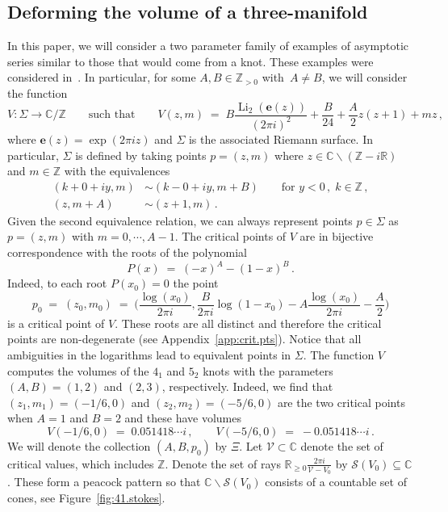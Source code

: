 \documentclass[12pt,reqno]{amsart}
\theoremstyle{definition}
\def\BZ{\mathbb Z}
\def\BR{\mathbb R}
\def\BC{\mathbb C}
\def\be{\begin{equation}}
\def\ee{\end{equation}}
\def\e{\mathbf e}
\renewcommand{\=}{\;=\;}
\newcommand{\Li}{\operatorname{Li}}
\begin{document}
\subsection{Deforming the volume of a three-manifold}
%
In this paper, we will consider a two parameter family of examples of asymptotic series similar to those that would come from a knot. These examples were considered in~\cite{GK:qser}. In particular, for some $A,B\in\BZ_{>0}$ with~$A\neq B$, we will consider the function
\be\label{eq:V}
  V:\Sigma\rightarrow\BC/\BZ
  \qquad\text{such that}\qquad
  V(z,m)\=B\frac{\Li_{2}(\e(z))}{(2\pi i)^2}+\frac{B}{24}+\frac{A}{2}z(z+1)+mz\,,
\ee
where $\e(z)=\exp(2\pi iz)$ and $\Sigma$ is the associated Riemann surface. In particular, $\Sigma$ is defined by taking points $p=(z,m)$ where $z\in\BC\backslash(\BZ-i\BR)$ and $m\in\BZ$ with the equivalences 
\be\label{eq:surface}
\begin{aligned}
(k+0+iy,m)&\sim(k-0+iy,m+B)\qquad\text{for }y<0\,,\;k\in\BZ\,,\\
(z,m+A)&\sim(z+1,m)\,.
\end{aligned}
\ee
Given the second equivalence relation, we can always represent points $p\in\Sigma$ as $p=(z,m)$ with $m=0,\cdots,A-1$. The critical points of $V$ are in bijective correspondence with the roots of the polynomial
\be
  P(x)\=(-x)^A-(1-x)^B\,.
\ee
Indeed, to each root $P(x_0)=0$ the point
\be\label{eq:crit.pts}
  p_0
  \=
  (z_0,m_0)
  \=
  \Big(\frac{\log(x_0)}{2\pi i},\frac{B}{2\pi i}\log(1-x_0)-A\frac{\log(x_0)}{2\pi i}-\frac{A}{2}\Big)
\ee
is a critical point of $V$. These roots are all distinct and therefore the critical points are non-degenerate (see Appendix~\ref{app:crit.pts}). Notice that all ambiguities in the logarithms lead to equivalent points in $\Sigma$. The function $V$ computes the volumes of the $4_1$ and $5_2$ knots with the parameters $(A,B)=(1,2)$ and $(2,3)$, respectively. Indeed, we find that $(z_1,m_1)=(-1/6,0)$ and $(z_2,m_2)=(-5/6,0)$ are the two critical points when $A=1$ and $B=2$ and these have volumes
\be\label{eq:41.crit.val}
  V(-1/6,0)\=0.051418\cdots i\,,
  \qquad
  V(-5/6,0)\=-0.051418\cdots i\,.
\ee
We will denote the collection $(A,B,p_0)$ by $\Xi$. Let $\mathcal{V}\subset\BC$ denote the set of critical values, which includes $\BZ$. Denote the set of rays $\BR_{\geq0}\frac{2\pi i}{\mathcal{V}-V_0}$ by $\mathcal{S}(V_{0})\subseteq\BC$. These form a peacock pattern so that $\BC\backslash\mathcal{S}(V_{0})$ consists of a countable set of cones, see Figure~\ref{fig:41.stokes}.

\medskip
\end{document}
